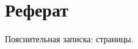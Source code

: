 {
	\titleformat{\section}[block]{\centering\normalfont\large\bfseries}{\thesection}{10pt}{}
	\section*{\centering Реферат}

	\par

		Пояснительная записка: \pageref{pagecount:expnote} страницы.

		
}

\pagebreak